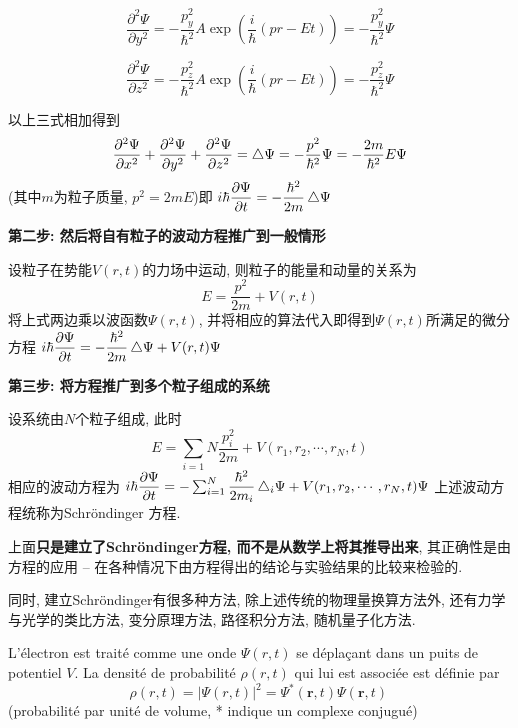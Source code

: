 \documentclass{article}
\begin{document}
$$
\dfrac{\partial^2 \Psi}{\partial y^2} 
= -\dfrac{p_y^2}{\hbar^2} A \exp(\dfrac{i}{\hbar} (p r - E t))
= -\dfrac{p_y^2}{\hbar^2} \Psi
$$

$$
\dfrac{\partial^2 \Psi}{\partial z^2} 
= -\dfrac{p_z^2}{\hbar^2} A \exp(\dfrac{i}{\hbar} (p r - E t))
= -\dfrac{p_z^2}{\hbar^2} \Psi
$$

以上三式相加得到
$$
\dfrac{\partial^2 \Psi}{\partial x^2} + \dfrac{\partial^2 \Psi}{\partial y^2} + \dfrac{\partial^2 \Psi}{\partial z^2} 
= \mathop{}\!\mathbin\bigtriangleup{\Psi}
= -\dfrac{p^2}{\hbar^2} \Psi
= -\dfrac{2 m}{\hbar^2} E \Psi
$$
(其中$m$为粒子质量, $p^2 = 2mE$)即
$i \hbar \dfrac{\partial \Psi}{\partial t} = - \dfrac{\hbar^2}{2m} \mathop{}\!\mathbin\bigtriangleup{\Psi}$

\textbf{第二步: 然后将自有粒子的波动方程推广到一般情形}

设粒子在势能$V(r,t)$的力场中运动, 则粒子的能量和动量的关系为
$$ E = \dfrac{p^2}{2m} + V(r,t) $$
将上式两边乘以波函数$\Psi(r,t)$, 并将相应的算法代入即得到$\Psi(r,t)$所满足的微分方程
$i \hbar \dfrac{\partial \Psi}{\partial t} = - \dfrac{\hbar^2}{2m} \mathop{}\!\mathbin\bigtriangleup{\Psi} + V(r,t) \Psi$

\textbf{第三步: 将方程推广到多个粒子组成的系统}

设系统由$N$个粒子组成, 此时
$$ E = \sum_{i=1}{N} \dfrac{p_i^2}{2m} + V(r_1, r_2, \cdots, r_N, t) $$
相应的波动方程为
$i \hbar \dfrac{\partial \Psi}{\partial t} = - \sum_{i=1}^N \dfrac{\hbar^2}{2m_i} \mathop{}\!\mathbin\bigtriangleup_i{\Psi} + V(r_1, r_2, \cdots, r_N, t) \Psi$
上述波动方程统称为Schr\"ondinger 方程.

上面\textbf{只是建立了Schr\"ondinger方程, 而不是从数学上将其推导出来}, 其正确性是由方程的应用 -- 在各种情况下由方程得出的结论与实验结果的比较来检验的.

同时, 建立Schr\"ondinger有很多种方法, 除上述传统的物理量换算方法外, 还有力学与光学的类比方法, 变分原理方法, 路径积分方法, 随机量子化方法.

L'\'electron est trait\'e comme une onde $\Psi(r,t)$ se d\'epla\c cant dans un puits de potentiel $V$.
La densit\'e de probabilit\'e $\rho(r,t)$ qui lui est associ\'ee est d\'efinie par
$$ \rho(r,t)= |\Psi(r,t)|^2=\Psi^*(\mathbf{r},t)\Psi(\mathbf{r},t)\,\!  $$
(probabilit\'e par unit\'e de volume, * indique un complexe conjugu\'e)
\end{document}
